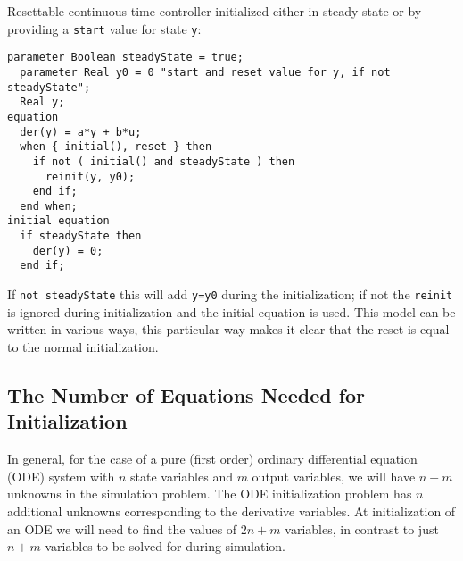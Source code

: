 \begin{example}
Resettable continuous time controller initialized either in steady-state or by providing a \lstinline!start! value for state \lstinline!y!:
\begin{lstlisting}[language=modelica]
  parameter Boolean steadyState = true;
  parameter Real y0 = 0 "start and reset value for y, if not steadyState";
  Real y;
equation
  der(y) = a*y + b*u;
  when { initial(), reset } then
    if not ( initial() and steadyState ) then
      reinit(y, y0);
    end if;
  end when;
initial equation
  if steadyState then
    der(y) = 0;
  end if;
\end{lstlisting}
If \lstinline!not steadyState! this will add \lstinline!y=y0! during the initialization; if not the \lstinline!reinit! is ignored during initialization and the initial equation is used.
This model can be written in various ways, this particular way makes it clear that the reset is equal to the normal initialization.
\end{example}

\subsection{The Number of Equations Needed for Initialization}\label{the-number-of-equations-needed-for-initialization}

\begin{nonnormative}
In general, for the case of a pure (first order) ordinary differential equation (ODE) system with $n$ state variables and $m$ output variables, we will have $n+m$ unknowns in the simulation problem.
The ODE initialization problem has $n$ additional unknowns corresponding to the derivative variables.
At initialization of an ODE we will need to find the values of $2n+m$ variables, in contrast to just $n+m$ variables to be solved for during simulation.
\end{nonnormative}

